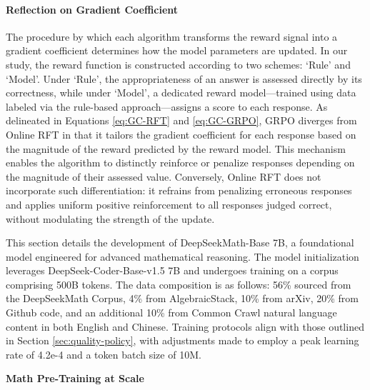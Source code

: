\paragraph{Reflection on Gradient Coefficient} The procedure by which each algorithm transforms the reward signal into a gradient coefficient determines how the model parameters are updated. In our study, the reward function is constructed according to two schemes: `Rule’ and `Model’. Under `Rule’, the appropriateness of an answer is assessed directly by its correctness, while under `Model’, a dedicated reward model—trained using data labeled via the rule-based approach—assigns a score to each response. As delineated in Equations \ref{eq:GC-RFT} and \ref{eq:GC-GRPO}, GRPO diverges from Online RFT in that it tailors the gradient coefficient for each response based on the magnitude of the reward predicted by the reward model. This mechanism enables the algorithm to distinctly reinforce or penalize responses depending on the magnitude of their assessed value. Conversely, Online RFT does not incorporate such differentiation: it refrains from penalizing erroneous responses and applies uniform positive reinforcement to all responses judged correct, without modulating the strength of the update.

This section details the development of DeepSeekMath-Base 7B, a foundational model engineered for advanced mathematical reasoning. The model initialization leverages DeepSeek-Coder-Base-v1.5 7B \citep{deepseek-coder} and undergoes training on a corpus comprising 500B tokens. The data composition is as follows: 56\% sourced from the DeepSeekMath Corpus, 4\% from AlgebraicStack, 10\% from arXiv, 20\% from Github code, and an additional 10\% from Common Crawl natural language content in both English and Chinese. Training protocols align with those outlined in Section \ref{sec:quality-policy}, with adjustments made to employ a peak learning rate of 4.2e-4 and a token batch size of 10M.

\textbf{Math Pre-Training at Scale}

